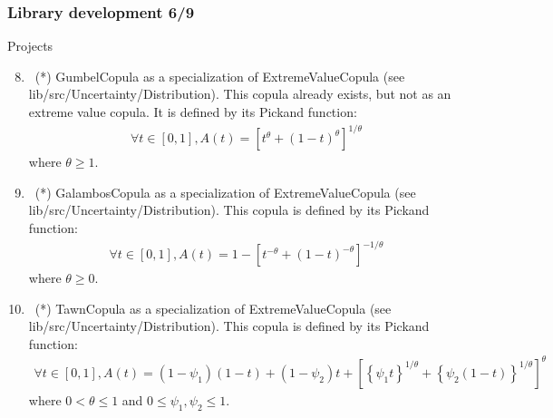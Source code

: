 \documentclass[8pt]{beamer}
\begin{document}
\begin{frame}
  \frametitle{Library development 6/9}
  \begin{block}{Projects}
    \begin{enumerate}
      \setcounter{enumi}{7}
    \item~(*) \alert{\ttfamily GumbelCopula} as a specialization of {\ttfamily ExtremeValueCopula} (see {\ttfamily lib/src/Uncertainty/Distribution}). This copula already exists, but not as an extreme value copula. It is defined by its Pickand function:
      \begin{align}
        \forall t\in[0,1], A(t)=\left[t^\theta+(1-t)^\theta\right]^{1/\theta}
      \end{align}
      where $\theta\geq 1$. 
    \item~(*) \alert{\ttfamily GalambosCopula} as a specialization of {\ttfamily ExtremeValueCopula} (see {\ttfamily lib/src/Uncertainty/Distribution}). This copula is defined by its Pickand function:
      \begin{align}
        \forall t\in[0,1], A(t)=1-\left[t^{-\theta}+(1-t)^{-\theta}\right]^{-1/\theta}
      \end{align}
      where $\theta\geq 0$.
    \item~(*) \alert{\ttfamily TawnCopula} as a specialization of {\ttfamily ExtremeValueCopula} (see {\ttfamily lib/src/Uncertainty/Distribution}). This copula is defined by its Pickand function:
      \begin{align}
        \forall t\in[0,1], A(t)=(1-\psi_1)(1-t)+(1-\psi_2)t+\left[\left\{\psi_1t\right\}^{1/\theta}+\left\{\psi_2(1-t)\right\}^{1/\theta}\right]^\theta
      \end{align}
      where $0<\theta\leq 1$ and $0\leq\psi_1,\psi_2\leq 1$.
    \end{enumerate}
  \end{block}
\end{frame}
\end{document}
